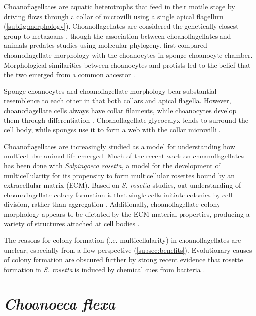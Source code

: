 Choanoflagellates are aquatic heterotrophs that feed in their motile stage by driving flows through a collar of microvilli using a single apical flagellum \citep{karpov1998} (\cref{subfig:morphology}).
Choanoflagellates are considered the genetically closest group to metazoans \citep{carr2008}, though the association between choanoflagellates and animals predates studies using molecular phylogeny.
\citet{james1871} first compared choanoflagellate morphology with the choanocytes in sponge choanocyte chamber. 
Morphological similarities between choanocytes and protists led to the belief that the two emerged from a common ancestor \citep{saedeleer1930,tuzet1963}.

Sponge choanocytes and choanoflagellate morphology bear substantial resemblence to each other in that both collars and apical flagella.
However, choanoflagellate cells always have collar filaments, while choanocytes develop them through differentiation \citep{mah2014}.
Choanoflagellate glycocalyx tends to surround the cell body, while sponges use it to form a web with the collar microvilli \citep{leadbeater2008}.

Choanoflagellates are increasingly studied as a model for understanding how multicellular animal life emerged. 
Much of the recent work on choanoflagellates has been done with \textit{Salpingoeca rosetta}, a model for the development of multicellularity for its propensity to form multicellular rosettes bound by an extracellular matrix (ECM).
Based on \textit{S. rosetta} studies, out understanding of choanoflagellate colony formation is that single cells initiate colonies by cell division, rather than aggregation \citep{fairclough2010}.
Additionally, choanoflagellate colony morphology appears to be dictated by the ECM material properties, producing a variety of structures attached at cell bodies \citep{larson2020}.

The reasons for colony formation (i.e. multicellularity) in choanoflagellates are unclear, especially from a flow perspective (\cref{subsec:benefits}). 
Evolutionary causes of colony formation are obscured further by strong recent evidence that rosette formation in \textit{S. rosetta} is induced by chemical cues from bacteria \citep{alegado2012,woznica2016}.

\section{\textit{Choanoeca flexa}}  %

